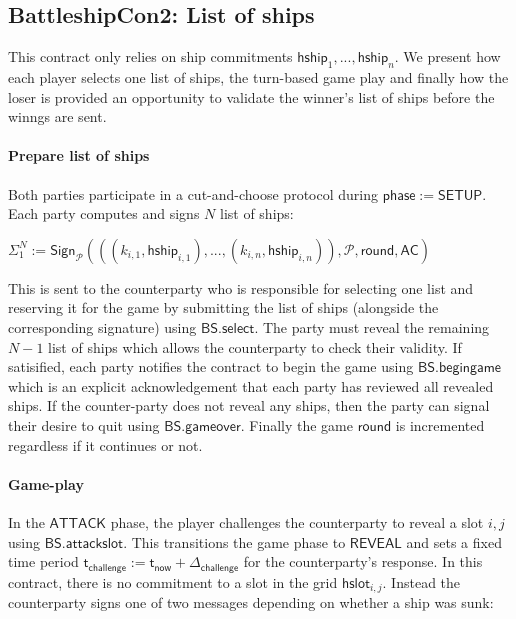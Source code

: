 \documentclass{llncs}
\newcommand{\gamestatus}{\mathsf{phase}}
\newcommand{\gamesetup}{\mathsf{SETUP}}
\newcommand{\gameattack}{\mathsf{ATTACK}}
\newcommand{\gamereveal}{\mathsf{REVEAL}}
\newcommand{\hslot}{\mathsf{hslot}}
\newcommand{\hship}{\mathsf{hship}}
\newcommand{\participant}{\mathcal{P}}
\newcommand{\sign}{\mathsf{Sign}}
\newcommand{\battleshipattackslot}{\mathsf{BS.attackslot}}
\newcommand{\battleshipbegin}{\mathsf{BS.begingame}}
\newcommand{\battleshipselectboard}{\mathsf{BS.select}}
\newcommand{\battleshipgameover}{\mathsf{BS.gameover}}
\newcommand{\appcontract}{\mathsf{AC}}
\newcommand{\timerchallenge}{\mathsf{\Delta}_{\mathsf{challenge}}}
\newcommand{\timechallenge}{\mathsf{t}_{\mathsf{challenge}}}
\newcommand{\timenow}{\mathsf{t}_{\mathsf{now}}}
\begin{document}
\subsection{BattleshipCon2: List of ships } 

This contract only relies on ship commitments  $\hship_{1},...,\hship_{n}$. 
We present how each player selects one list of ships, the turn-based game play and finally how the loser is provided an opportunity to validate the winner's list of ships before the winngs are sent. 

\paragraph{Prepare list of ships} Both parties participate in a cut-and-choose protocol during $\gamestatus := \gamesetup$. 
Each party computes  and signs $N$ list of ships: 

\begin{center}
 $\Sigma_{1}^{N} := \sign_{\participant}(((k_{i,1},\hship_{i,1}),...,(k_{i,n},\hship_{i,n})), \participant, \mathsf{round}, \appcontract)$ 
\end{center}
 
This is sent to the counterparty who is responsible for selecting one list and reserving it for the game by submitting the list of ships (alongside the corresponding signature) using $\battleshipselectboard$. 
The party must reveal the remaining $N-1$ list of ships which allows the counterparty to check their validity. 
If satisified, each party notifies the contract to begin the game using $\battleshipbegin$ which is an explicit acknowledgement that each party has reviewed all revealed ships.
If the counter-party does not reveal any ships, then the party can signal their desire to quit  using $\battleshipgameover$.
Finally the game $\mathsf{round}$ is incremented regardless if it continues or not. 

\paragraph{Game-play} \label{sec:gameplayships}

In the $\gameattack$ phase, the player challenges the counterparty to reveal a slot $i,j$ using $\battleshipattackslot$.
This transitions the game phase to $\gamereveal$ and sets a fixed time period $\timechallenge := \timenow + \timerchallenge$ for the counterparty's response. 
In this contract, there is no commitment to a slot in the grid $\hslot_{i,j}$.
Instead the counterparty signs one of two messages depending on whether a ship was sunk:
\end{document}
